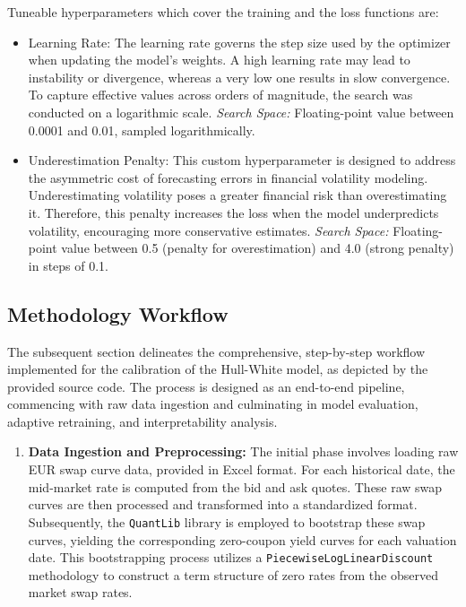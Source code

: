 {\begin{itemize}
\end{itemize}

Tuneable hyperparameters which cover the training and the loss functions are:
\begin{itemize}
	\item Learning Rate: The learning rate governs the step size used by the optimizer when updating the model’s weights. A high learning rate may lead to instability or divergence, whereas a very low one results in slow convergence. To capture effective values across orders of magnitude, the search was conducted on a logarithmic scale. \newline
	      \textit{Search Space:} Floating-point value between 0.0001 and 0.01, sampled logarithmically.

	\item Underestimation Penalty: This custom hyperparameter is designed to address the asymmetric cost of forecasting errors in financial volatility modeling. Underestimating volatility poses a greater financial risk than overestimating it. Therefore, this penalty increases the loss when the model underpredicts volatility, encouraging more conservative estimates. \newline
	      \textit{Search Space:} Floating-point value between 0.5 (penalty for overestimation) and 4.0 (strong penalty) in steps of 0.1.
\end{itemize}

\subsection{Methodology Workflow}
The subsequent section delineates the comprehensive, step-by-step workflow implemented for the calibration of the Hull-White model, as depicted by the provided source code. The process is designed as an end-to-end pipeline, commencing with raw data ingestion and culminating in model evaluation, adaptive retraining, and interpretability analysis.

\begin{enumerate}
	\item \textbf{Data Ingestion and Preprocessing:}
	      The initial phase involves loading raw EUR swap curve data, provided in Excel format. For each historical date, the mid-market rate is computed from the bid and ask quotes. These raw swap curves are then processed and transformed into a standardized format. Subsequently, the \texttt{QuantLib} library is employed to bootstrap these swap curves, yielding the corresponding zero-coupon yield curves for each valuation date. This bootstrapping process utilizes a \texttt{PiecewiseLogLinearDiscount} methodology to construct a term structure of zero rates from the observed market swap rates.


\end{enumerate}}
